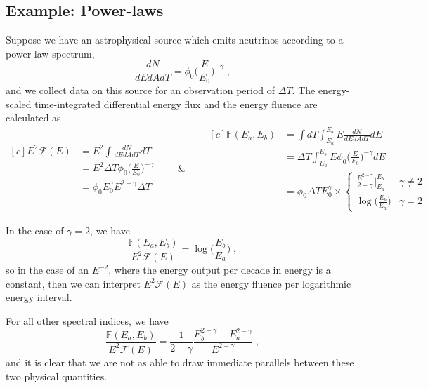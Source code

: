 \documentclass[a4paper,11pt]{article}
\newcommand\ddfrac[2]{\frac{\displaystyle #1}{\displaystyle #2}}
\begin{document}
\subsection{Example: Power-laws}
Suppose we have an astrophysical source which emits neutrinos according to a power-law spectrum, 
\begin{equation}
    \frac{dN}{dEdAdT}= \phi_0 \Big(\frac{E}{E_0}\Big)^{-\gamma} \; ,
\end{equation}
and we collect data on this source for an observation period of $\Delta T$. The energy-scaled time-integrated differential energy flux and the energy fluence are calculated as 
\begin{equation*}
\begin{aligned}[c]
    E^2\mathcal{F}(E) &= E^2\int \frac{dN}{dEdAdT} dT \\
    &= E^2 \Delta T \phi_0 \Big(\frac{E}{E_0}\Big)^{-\gamma} \\
    &= \phi_0 E_0^{\gamma} E^{2-\gamma}\Delta T
\end{aligned}
\qquad\&\qquad
\begin{aligned}[c]
    \mathbb{F}(E_a, E_b) &= \int dT \int_{E_a}^{E_b} E \frac{dN}{dEdAdT} dE \\ 
    &= \Delta T \int_{E_a}^{E_b} E \phi_0 \Big(\frac{E}{E_0}\Big)^{-\gamma} dE \\
    &= \phi_0 \Delta T E_0^{\gamma} \times \begin{cases}
            \ddfrac{E^{2-\gamma}}{2-\gamma}\Big|_{E_a}^{E_b} &\gamma\neq 2 \\ \log\big(\ddfrac{E_b}{E_a}\big) & \gamma = 2
        \end{cases}
\end{aligned}
\end{equation*}

In the case of $\gamma = 2$, we have 
\begin{equation}
    \frac{\mathbb{F}(E_a, E_b)}{E^2\mathcal{F}(E)} = \log\big(\ddfrac{E_b}{E_a}\big) \; ,
\end{equation}
so in the case of an $E^{-2}$, where the energy output per decade in energy is a constant, then we can interpret $E^2\mathcal{F}(E)$ as the energy fluence per logarithmic energy interval.

For all other spectral indices, we have
\begin{equation}
    \frac{\mathbb{F}(E_a, E_b)}{E^2\mathcal{F}(E)} = 
    \frac{1}{2-\gamma}\frac{E_b^{2-\gamma} - E_a^{2-\gamma}}{E^{2-\gamma}} \; ,
\end{equation}
and it is clear that we are not as able to draw immediate parallels between these two physical quantities.
\end{document}

